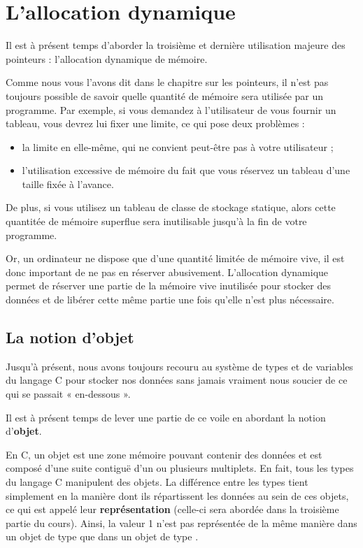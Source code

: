 \chapter{L'allocation dynamique}
\label{lallocation-dynamique}

Il est à présent temps d'aborder la troisième et dernière utilisation
majeure des pointeurs : l'allocation dynamique de mémoire.

Comme nous vous l'avons dit dans le chapitre sur les pointeurs, il n'est
pas toujours possible de savoir quelle quantité de mémoire sera utilisée
par un programme. Par exemple, si vous demandez à l'utilisateur de vous
fournir un tableau, vous devrez lui fixer une limite, ce qui pose deux
problèmes :

\begin{itemize}
\item
  la limite en elle-même, qui ne convient peut-être pas à votre
  utilisateur ;
\item
  l'utilisation excessive de mémoire du fait que vous réservez un
  tableau d'une taille fixée à l'avance.
\end{itemize}

De plus, si vous utilisez un tableau de classe de stockage statique,
alors cette quantitée de mémoire superflue sera inutilisable jusqu'à la
fin de votre programme.

Or, un ordinateur ne dispose que d'une quantité limitée de mémoire vive,
il est donc important de ne pas en réserver abusivement. L'allocation
dynamique permet de réserver une partie de la mémoire vive inutilisée
pour stocker des données et de libérer cette même partie une fois
qu'elle n'est plus nécessaire.

\section{La notion d'objet}
\label{la-notion-dobjet}

Jusqu'à présent, nous avons toujours recouru au système de types et de
variables du langage C pour stocker nos données sans jamais vraiment
nous soucier de ce qui se passait « en-dessous ».

Il est à présent temps de lever une partie de ce voile en abordant la
notion d'\textbf{objet}.

En C, un objet est une zone mémoire pouvant contenir des données et est
composé d'une suite contiguë d'un ou plusieurs multiplets. En fait, tous
les types du langage C manipulent des objets. La différence entre les
types tient simplement en la manière dont ils répartissent les données
au sein de ces objets, ce qui est appelé leur \textbf{représentation}
(celle-ci sera abordée dans la troisième partie du cours). Ainsi, la
valeur 1 n'est pas représentée de la même manière dans un objet de type
 que dans un objet de type .

